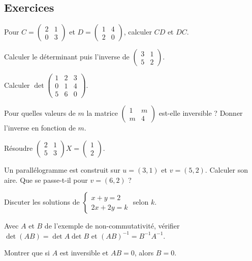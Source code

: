\subsection{Exercices}
\begin{exo}[A]\label{c6e1}
Pour $C=\begin{pmatrix}2&1\\0&3\end{pmatrix}$ et $D=\begin{pmatrix}1&4\\2&0\end{pmatrix}$, calculer $CD$ et $DC$.
\end{exo}
\begin{exo}[A]\label{c6e2}
Calculer le déterminant puis l'inverse de $\begin{pmatrix}3&1\\5&2\end{pmatrix}$.
\end{exo}
\begin{exo}[A]\label{c6e3}
Calculer $\det\begin{pmatrix}1&2&3\\0&1&4\\5&6&0\end{pmatrix}$.
\end{exo}
\begin{exo}[B]\label{c6e4}
Pour quelles valeurs de $m$ la matrice $\begin{pmatrix}1&m\\m&4\end{pmatrix}$ est-elle inversible ? Donner l'inverse en fonction de $m$.
\end{exo}
\begin{exo}[B]\label{c6e5}
Résoudre $\begin{pmatrix}2&1\\5&3\end{pmatrix}X=\begin{pmatrix}1\\2\end{pmatrix}$.
\end{exo}
\begin{exo}[B]\label{c6e6}
Un parallélogramme est construit sur $u=(3,1)$ et $v=(5,2)$. Calculer son aire. Que se passe-t-il pour $v=(6,2)$ ?
\end{exo}
\begin{exo}[C]\label{c6e7}
Discuter les solutions de $\begin{cases}x+y=2\\2x+2y=k\end{cases}$ selon $k$.
\end{exo}
\begin{exo}[C]\label{c6e8}
Avec $A$ et $B$ de l'exemple de non-commutativité, vérifier $\det(AB)=\det A\det B$ et $(AB)^{-1}=B^{-1}A^{-1}$.
\end{exo}
\begin{exo}[C]\label{c6e9}
Montrer que si $A$ est inversible et $AB=0$, alors $B=0$.
\end{exo}

